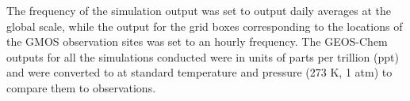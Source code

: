 \begin{table}[H]
\label{tab:geos_chem_simulation_description}

\centering
{}

\end{table}
\begin{flushleft}
 The frequency of the simulation output was set to output daily \hg averages at the global scale, while the \hg output for the grid boxes corresponding to the locations of the GMOS observation sites was set to an hourly frequency. The GEOS-Chem outputs for all the simulations conducted were in units of parts per trillion (ppt) and were converted to \nang at standard temperature and pressure (273 K, 1 atm) to compare them to observations.
\end{flushleft}

